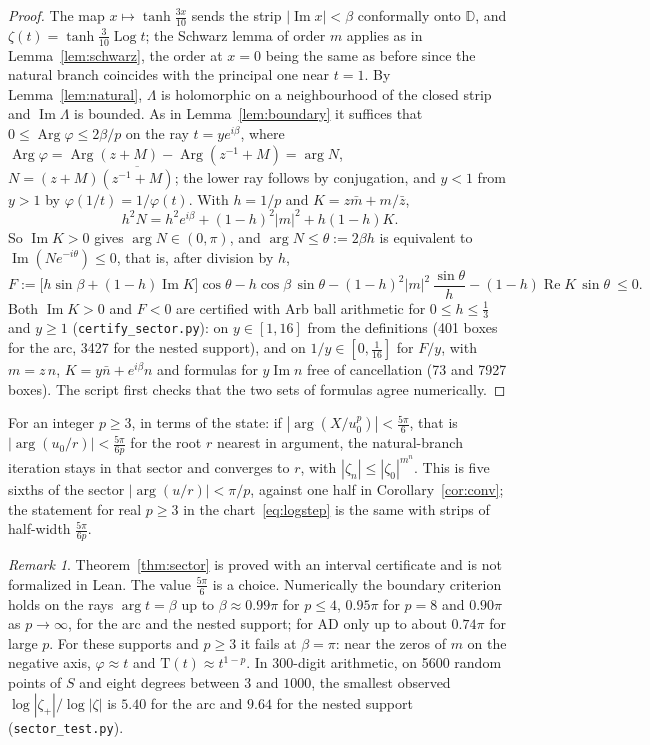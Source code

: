 \documentclass[10pt,a4paper]{article}
\theoremstyle{plain}
\theoremstyle{remark}
\newtheorem{remark}[theorem]{Remark}
\numberwithin{equation}{section}
\newcommand{\D}{\mathbb{D}}
\newcommand{\Tm}{\mathrm{T}}
\DeclareMathOperator{\re}{Re}\DeclareMathOperator{\im}{Im}
\DeclareMathOperator{\Arg}{Arg}\DeclareMathOperator{\Log}{Log}
\begin{document}
\begin{proof}
The map $x\mapsto\tanh\frac{3x}{10}$ sends the strip $|\im x|<\beta$ conformally onto $\D$, and
$\zeta(t)=\tanh\frac{3}{10}\Log t$; the Schwarz lemma of order $m$ applies as in
Lemma~\ref{lem:schwarz}, the order at $x=0$ being the same as before since the natural branch
coincides with the principal one near $t=1$. By Lemma~\ref{lem:natural}, $\Lambda$ is holomorphic on
a neighbourhood of the closed strip and $\im\Lambda$ is bounded. As in Lemma~\ref{lem:boundary} it
suffices that $0\le\Arg\varphi\le2\beta/p$ on the ray $t=ye^{i\beta}$, where
$\Arg\varphi=\Arg(z+M)-\Arg(z^{-1}+M)=\arg N$, $N=(z+M)\overline{(z^{-1}+M)}$; the lower ray follows by
conjugation, and $y<1$ from $y>1$ by $\varphi(1/t)=1/\varphi(t)$. With $h=1/p$ and
$K=z\bar m+m/\bar z$,
\[
  h^{2}N=h^{2}e^{i\beta}+(1-h)^{2}|m|^{2}+h(1-h)K .
\]
So $\im K>0$ gives $\arg N\in(0,\pi)$, and $\arg N\le\theta:=2\beta h$ is equivalent to
$\im(Ne^{-i\theta})\le0$, that is, after division by $h$,
\[
 F:=\bigl[h\sin\beta+(1-h)\im K\bigr]\cos\theta-h\cos\beta\,\sin\theta
   -(1-h)^{2}|m|^{2}\,\frac{\sin\theta}{h}-(1-h)\re K\,\sin\theta\ \le0 .
\]
Both $\im K>0$ and $F<0$ are certified with Arb ball arithmetic for $0\le h\le\frac13$ and $y\ge1$
(\texttt{certify\_sector.py}): on $y\in[1,16]$ from the definitions (401 boxes for the arc, 3427
for the nested support), and on $1/y\in[0,\frac1{16}]$ for $F/y$, with $m=z\,n$,
$K=y\bar n+e^{i\beta}n$ and formulas for $y\im n$ free of cancellation (73 and 7927 boxes). The
script first checks that the two sets of formulas agree numerically.
\end{proof}

For an integer $p\ge3$, in terms of the state: if $|\arg(X/u_0^{p})|<\frac{5\pi}6$, that is
$|\arg(u_0/r)|<\frac{5\pi}{6p}$ for the root $r$ nearest in argument, the natural-branch iteration
stays in that sector and converges to $r$, with $|\zeta_n|\le|\zeta_0|^{m^{n}}$. This is five sixths
of the sector $|\arg(u/r)|<\pi/p$, against one half in Corollary~\ref{cor:conv}; the statement for
real $p\ge3$ in the chart~\eqref{eq:logstep} is the same with strips of half-width $\frac{5\pi}{6p}$.

\begin{remark}\label{rem:sector}
Theorem~\ref{thm:sector} is proved with an interval certificate and is not formalized in Lean. The
value $\frac{5\pi}6$ is a choice. Numerically the boundary criterion holds on the rays
$\arg t=\beta$ up to $\beta\approx0.99\pi$ for $p\le4$, $0.95\pi$ for $p=8$ and $0.90\pi$ as
$p\to\infty$, for the arc and the nested support; for AD only up to about $0.74\pi$ for large $p$.
For these supports and $p\ge3$ it fails at $\beta=\pi$: near the zeros of $m$ on the negative axis,
$\varphi\approx t$ and $\Tm(t)\approx t^{1-p}$. In 300-digit arithmetic, on 5600 random points of $S$ and eight degrees
between $3$ and $1000$, the smallest observed $\log|\zeta_+|/\log|\zeta|$ is $5.40$ for the arc and
$9.64$ for the nested support (\texttt{sector\_test.py}).
\end{remark}
\end{document}

